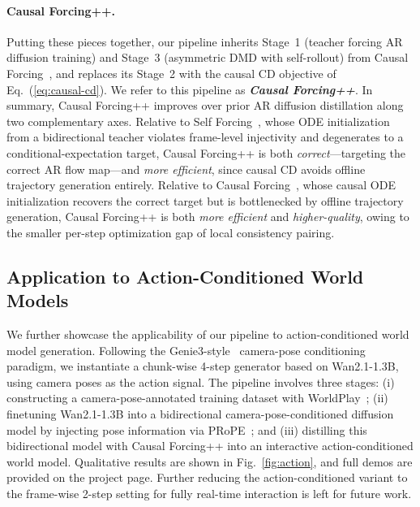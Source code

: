 \paragraph{Causal Forcing++.} Putting these pieces together, our pipeline inherits Stage~1 (teacher forcing AR diffusion training) and Stage~3 (asymmetric DMD with self-rollout) from Causal Forcing~\cite{zhu2026causal}, and replaces its Stage~2 with the causal CD objective of Eq.~(\ref{eq:causal-cd}). We refer to this pipeline as \textbf{\textit{Causal Forcing++}}. In summary, Causal Forcing++ improves over prior AR diffusion distillation along two complementary axes. Relative to Self Forcing~\cite{huang2025self}, whose ODE initialization from a bidirectional teacher violates frame-level injectivity and degenerates to a conditional-expectation target, Causal Forcing++ is both \emph{correct}---targeting the correct AR flow map---and \emph{more efficient}, since causal CD avoids offline trajectory generation entirely. Relative to Causal Forcing~\cite{zhu2026causal}, whose causal ODE initialization recovers the correct target but is bottlenecked by offline trajectory generation, Causal Forcing++ is both \emph{more efficient} and \emph{higher-quality}, owing to the smaller per-step optimization gap of local consistency pairing.

\subsection{Application to Action-Conditioned World Models}
\label{sec:application}

We further showcase the applicability of our pipeline to action-conditioned world model generation. Following the Genie3-style~\cite{genie3} camera-pose conditioning paradigm, we instantiate a chunk-wise 4-step generator based on Wan2.1-1.3B, using camera poses as the action signal. The pipeline involves three stages: (i) constructing a camera-pose-annotated training dataset with WorldPlay~\cite{sun2025worldplay}; (ii) finetuning Wan2.1-1.3B into a bidirectional camera-pose-conditioned diffusion model by injecting pose information via PRoPE~\cite{li2026cameras}; and (iii) distilling this bidirectional model with Causal Forcing++ into an interactive action-conditioned world model. Qualitative results are shown in Fig.~\ref{fig:action}, and full demos are provided on the project page. Further reducing the action-conditioned variant to the frame-wise 2-step setting for fully real-time interaction is left for future work.

